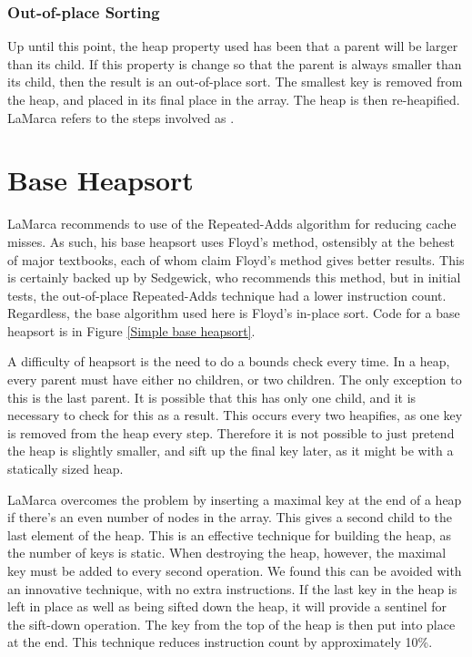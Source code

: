 \subsubsection{Out-of-place Sorting}
Up until this point, the heap property used has been that a parent will be
larger than its child. If this property is change so that the parent is always
smaller than its child, then the result is an out-of-place sort. The smallest
key is removed from the heap, and placed in its final place in the array. The
heap is then re-heapified. LaMarca refers to the steps involved as
.

\section{Base Heapsort}
LaMarca recommends to use of the Repeated-Adds algorithm for reducing
cache misses. As such, his base heapsort uses Floyd's method, ostensibly at
the behest of major textbooks, each of whom claim Floyd's method gives better
results. This is certainly backed up by Sedgewick, who recommends this method,
but in initial tests, the out-of-place Repeated-Adds technique had a lower
instruction count. Regardless, the base algorithm used here is Floyd's in-place
sort. Code for a base heapsort is in Figure \ref{Simple base heapsort}.


A difficulty of heapsort is the need to do a bounds check every time. In a heap,
every parent must have either no children, or two children. The only exception
to this is the last parent. It is possible that this has only one child, and it
is necessary to check for this as a result. This occurs every two heapifies, as
one key is removed from the heap every step. Therefore it is not possible to just
pretend the heap is slightly smaller, and sift up the final key later, as it
might be with a statically sized heap.

LaMarca overcomes the problem by inserting a maximal key at the end of a heap if
there's an even number of nodes in the array. This gives a second child to the
last element of the heap. This is an effective technique for building the heap,
as the number of keys is static. When destroying the heap, however, the
maximal key must be added to every second operation. We found this can be
avoided with an innovative technique, with no extra instructions. If the last
key in the heap is left in place as well as being sifted down the heap, it will
provide a sentinel for the sift-down operation. The key from the top of the heap
is then put into place at the end. This technique reduces instruction count by
approximately 10\%.

